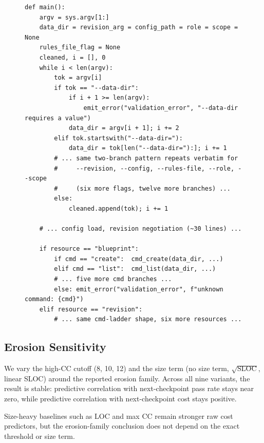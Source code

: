 \begin{figure}[h]
\begin{lstlisting}[caption={\texttt{main()} from Opus~4.7's \texttt{forge} solution at $\ckpt{8}$, abridged to expose structure. The \texttt{argparse} call has been removed; each of seven flags is handled by an identical pair of branches. After parsing, a nested \texttt{if resource == ...: if cmd == ...} ladder dispatches over seven resources.},label={lst:erosion-main-cp8}]
def main():
    argv = sys.argv[1:]
    data_dir = revision_arg = config_path = role = scope = None
    rules_file_flag = None
    cleaned, i = [], 0
    while i < len(argv):
        tok = argv[i]
        if tok == "--data-dir":
            if i + 1 >= len(argv):
                emit_error("validation_error", "--data-dir requires a value")
            data_dir = argv[i + 1]; i += 2
        elif tok.startswith("--data-dir="):
            data_dir = tok[len("--data-dir="):]; i += 1
        # ... same two-branch pattern repeats verbatim for
        #     --revision, --config, --rules-file, --role, --scope
        #     (six more flags, twelve more branches) ...
        else:
            cleaned.append(tok); i += 1

    # ... config load, revision negotiation (~30 lines) ...

    if resource == "blueprint":
        if cmd == "create":  cmd_create(data_dir, ...)
        elif cmd == "list":  cmd_list(data_dir, ...)
        # ... five more cmd branches ...
        else: emit_error("validation_error", f"unknown command: {cmd}")
    elif resource == "revision":
        # ... same cmd-ladder shape, six more resources ...
\end{lstlisting}
\end{figure}

\subsection{Erosion Sensitivity}\label{sec:erosion-sensitivity}

We vary the high-CC cutoff (8, 10, 12) and the size term (no size term, $\sqrt{\text{SLOC}}$, linear SLOC) around the reported erosion family. Across all nine variants, the result is stable: predictive correlation with next-checkpoint pass rate stays near zero, while predictive correlation with next-checkpoint cost stays positive.



Size-heavy baselines such as LOC and max CC remain stronger raw cost predictors, but the erosion-family conclusion does not depend on the exact threshold or size term.
